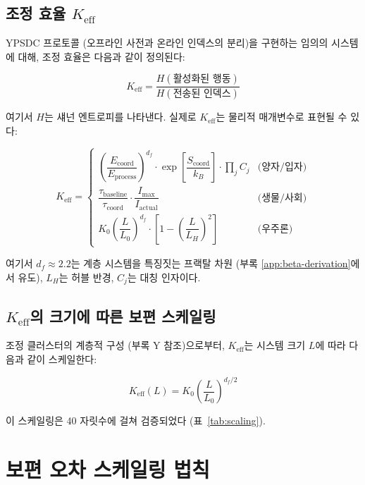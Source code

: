 \documentclass[12pt,a4paper]{article}
\newcommand{\Keff}{K_{\mathrm{eff}}}
\newcommand{\df}{d_{\!f}}
\theoremstyle{remark}
\begin{document}
	\subsection{조정 효율 \(\Keff\)}
	
	YPSDC 프로토콜 (오프라인 사전과 온라인 인덱스의 분리)을 구현하는 임의의 시스템에 대해, 조정 효율은 다음과 같이 정의된다:
	
	\begin{equation}
		\Keff = \frac{H(\text{활성화된 행동})}{H(\text{전송된 인덱스})}
		\label{eq:keff-def}
	\end{equation}
	
	여기서 $H$는 섀넌 엔트로피를 나타낸다. 실제로 \(\Keff\)는 물리적 매개변수로 표현될 수 있다:
	
	\begin{equation}
		\Keff = 
		\begin{cases}
			\left(\dfrac{E_{\text{coord}}}{E_{\text{process}}}\right)^{\df} \cdot \exp\left[\dfrac{S_{\text{coord}}}{k_B}\right] \cdot \prod_j C_j & \text{(양자/입자)} \\[1em]
			\dfrac{\tau_{\text{baseline}}}{\tau_{\text{coord}}} \cdot \dfrac{I_{\text{max}}}{I_{\text{actual}}} & \text{(생물/사회)} \\[1em]
			K_0 \left(\dfrac{L}{L_0}\right)^{\df} \cdot \left[1 - \left(\dfrac{L}{L_H}\right)^2\right] & \text{(우주론)}
		\end{cases}
		\label{eq:keff-cases}
	\end{equation}
	
	여기서 \(\df \approx 2.2\)는 계층 시스템을 특징짓는 프랙탈 차원 (부록 \ref{app:beta-derivation}에서 유도), \(L_H\)는 허블 반경, \(C_j\)는 대칭 인자이다.
	
	\subsection{\(\Keff\)의 크기에 따른 보편 스케일링}
	
	조정 클러스터의 계층적 구성 (부록 Y 참조)으로부터, \(\Keff\)는 시스템 크기 \(L\)에 따라 다음과 같이 스케일한다:
	
	\begin{equation}
		\Keff(L) = K_0 \left(\frac{L}{L_0}\right)^{\df/2}
		\label{eq:keff-scaling}
	\end{equation}
	
	이 스케일링은 40 자릿수에 걸쳐 검증되었다 (표~\ref{tab:scaling}).
	
	\section{보편 오차 스케일링 법칙}
	\label{sec:error-law}
	
\end{document}
